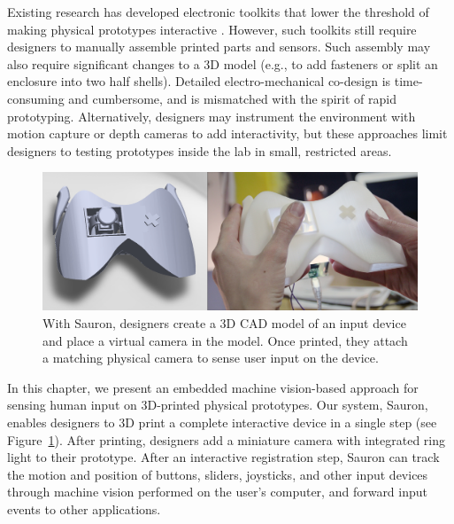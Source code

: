 Existing research has developed electronic toolkits that lower the threshold of making physical prototypes interactive \cite{arduino, greenberg-phidgets, hartmann-dtools}.
However, such toolkits still require designers to manually assemble printed parts and sensors. Such assembly may also require significant changes to a 3D model (e.g., to add fasteners or split an enclosure into two half shells). Detailed electro-mechanical co-design is time-consuming and cumbersome, and is mismatched with the spirit of rapid prototyping. Alternatively, designers may instrument the environment with motion capture \cite{akaoka-displayobjects} or depth cameras \cite{wilson-depthtouch} to add interactivity, but these approaches limit designers to testing prototypes inside the lab in small, restricted areas.

\begin{figure}
\centering
\includegraphics[width=\textwidth]{figures/sauron/fig1-gamecontroller.jpg}
\caption{With Sauron, designers create a 3D CAD model of an input device and place a virtual camera in the model. Once printed, they attach a matching physical camera to sense user input on the device.}
\label{fig:sauron-teaser}
\end{figure}

In this chapter, we present an embedded machine vision-based approach for sensing human input on 3D-printed physical prototypes. Our system, Sauron, enables designers to 3D print a complete interactive device in a single step (see Figure~\ref{fig:sauron-teaser}). After printing, designers add a miniature camera with integrated ring light to their prototype. After an interactive registration step, Sauron can track the motion and position of buttons, sliders, joysticks, and other input devices through machine vision performed on the user's computer, and forward input events to other applications.

